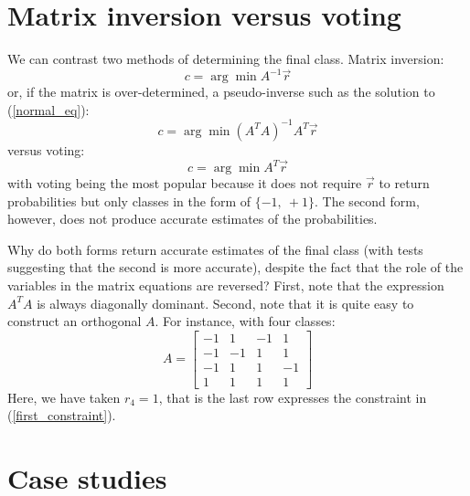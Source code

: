 \documentclass{article}
\begin{document}
\section{Matrix inversion versus voting}

We can contrast two methods of determining the final class.  Matrix inversion:
\begin{equation}
c=\arg \min A^{-1} \vec r
\label{inverse}
\end{equation}
or, if the matrix is over-determined, a pseudo-inverse such as
the solution to (\ref{normal_eq}):
\begin{equation}
c=\arg \min (A^T A)^{-1}A^T \vec r
\label{pseudoinverse}
\end{equation}
versus voting:
\begin{equation}
c=\arg \min A^T \vec r
\label{voting}
\end{equation}
with voting being the most popular because it does not require $\vec r$ to
return probabilities but only classes in the form of $\lbrace -1,~+1\rbrace$.
The second form, however, does not produce accurate estimates of the
probabilities.

Why do both forms return accurate estimates of the final class (with tests
suggesting that the second is more accurate), despite the fact that the
role of the variables in the matrix equations are reversed?
First, note that the expression $A^T A$ is always diagonally dominant.
Second, note that it
is quite easy to construct an orthogonal $A$.
For instance, with four classes:
\begin{equation}
A=\left [
\begin{array}{cccc}
-1 & 1 & -1 & 1 \\
-1 & -1 & 1 & 1 \\
-1 & 1 & 1 & -1 \\
1 & 1 & 1 & 1
\label{ortho3}
\end{array}
\right ]
\end{equation}
Here, we have taken $r_4=1$, that is the last row expresses the constraint
in (\ref{first_constraint}).

\section{Case studies}
\end{document}
